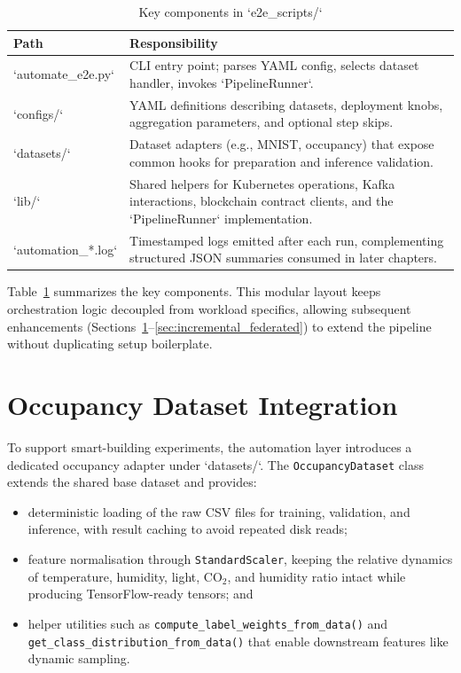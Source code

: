 \begin{table}[h!]
    \centering
    \caption{Key components in `e2e\_scripts/`}
    \label{tab:e2e_components}
    \begin{tabular}{p{} p{}}
        \toprule
        \textbf{Path} & \textbf{Responsibility} \\
        \midrule
        `automate\_e2e.py` & CLI entry point; parses YAML config, selects dataset handler, invokes `PipelineRunner`. \\
        `configs/` & YAML definitions describing datasets, deployment knobs, aggregation parameters, and optional step skips. \\
        `datasets/` & Dataset adapters (e.g., MNIST, occupancy) that expose common hooks for preparation and inference validation. \\
        `lib/` & Shared helpers for Kubernetes operations, Kafka interactions, blockchain contract clients, and the `PipelineRunner` implementation. \\
        `automation_*.log` & Timestamped logs emitted after each run, complementing structured JSON summaries consumed in later chapters. \\
    \bottomrule
    \end{tabular}
\end{table}

Table~\ref{tab:e2e_components} summarizes the key components. This modular layout keeps orchestration logic decoupled from workload specifics, allowing subsequent enhancements (Sections~\ref{sec:occupancy_integration}--\ref{sec:incremental_federated}) to extend the pipeline without duplicating setup boilerplate.

\section{Occupancy Dataset Integration}
\label{sec:occupancy_integration}

To support smart-building experiments, the automation layer introduces a dedicated occupancy adapter under `datasets/`. The \texttt{OccupancyDataset} class extends the shared base dataset and provides:

\begin{itemize}
    \item deterministic loading of the raw CSV files for training, validation, and inference, with result caching to avoid repeated disk reads;
    \item feature normalisation through \texttt{StandardScaler}, keeping the relative dynamics of temperature, humidity, light, CO$_2$, and humidity ratio intact while producing TensorFlow-ready tensors; and
    \item helper utilities such as \texttt{compute\_label\_weights\_from\_data()} and \texttt{get\_class\_distribution\_from\_data()} that enable downstream features like dynamic sampling.
\end{itemize}

